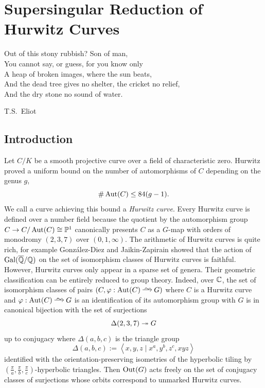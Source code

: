 \documentclass[main.tex]{subfiles}
\begin{document}
 

\chapter{Supersingular Reduction of Hurwitz Curves}
\epigraph{%
\raggedright
Out of this stony rubbish? Son of man,\\
You cannot say, or guess, for you know only \\
A heap of broken images, where the sun beats,\\
And the dead tree gives no shelter, the cricket no relief,\\
And the dry stone no sound of water.
}{T.S.\ Eliot}
\section{Introduction}

Let $C / K$ be a smooth projective curve over a field of characteristic zero. Hurwitz proved a uniform bound on the number of automorphisms of $C$ depending on the genus $g$,
\[ \# \operatorname{\mathrm{Aut}}(C) \le 84(g-1). \]
We call a curve achieving this bound a \textit{Hurwitz curve}. Every Hurwitz curve is defined over a number field because the quotient by the automorphism group $C \to C /\operatorname{\mathrm{Aut}}(C) \cong \mathbb{P}^1$ canonically presents $C$ as a $G$-\Belyi map with orders of monodromy $(2,3,7)$ over $(0,1,\infty)$. The arithmetic of Hurwitz curves is quite rich, for example Gonz\'alez-Diez and Jaikin-Zapirain \cite{gonzalez-diez:galois_moduli} showed that the action of $\operatorname{\mathrm{Gal}}(\overline{\mathbb{Q}}/\mathbb{Q})$ on the set of isomorphism classes of Hurwitz curves is faithful. However, Hurwitz curves only appear in a sparse set of genera. Their geometric classification can be entirely reduced to group theory. Indeed, over $\mathbb{C}$, the set of isomorphism classes of pairs $(C, \varphi : \Aut(C) \iso G)$ where $C$ is a Hurwitz curve and $\varphi : \Aut(C) \iso G$ is an identification of its automorphism group with $G$ is in canonical bijection with the set of surjections
\[ \Delta(2,3,7) \twoheadrightarrow G \]
up to conjugacy where $\Delta(a,b,c)$ is the triangle group
\[ \Delta(a,b,c) := \left< x,y,z \mid x^a, y^b, z^c, xyz \right> \]
identified with the orientation-preserving isometries of the hyperbolic tiling by $(\frac{\pi}{a},\frac{\pi}{b},\frac{\pi}{c})$-hyperbolic triangles. Then $\operatorname{\mathrm{Out}}(G)$ acts freely on the set of conjugacy classes of surjections whose orbits correspond to unmarked Hurwitz curves.
\end{document}
